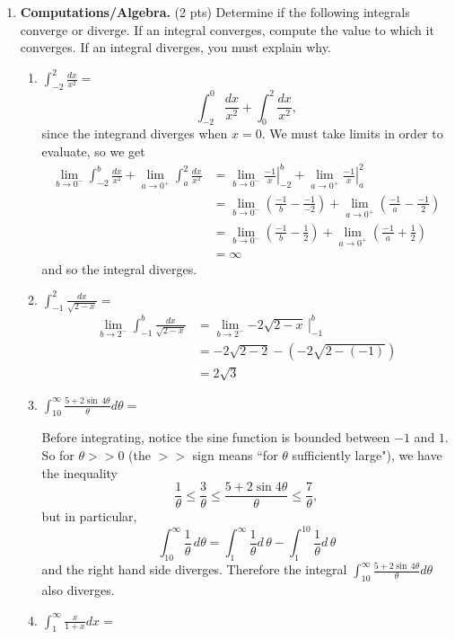\documentclass[11pt,letterpaper]{article}
\begin{document}
\begin{enumerate}
\begin{enumerate}
{\it -see the solution posted on the course website -}
\vspace{10pc}
\item (3 pts) Find $a$ and $b$.

{\it -see the solution posted on the course website -}
\vspace{9pc}
\end{enumerate}

\vspace{1pc}

\item \textbf{Computations/Algebra.} (2 pts)  Determine if the following integrals converge or diverge.  If an integral converges, compute the value to which it converges.  If an integral diverges, you must explain why.  \begin{enumerate}
\item $\int_{-2}^2\frac{dx}{x^2}=$
\[\int_{-2}^0\frac{dx}{x^2}+\int_0^2\frac{dx}{x^2},\]
since the integrand diverges when $x=0$.  We must take limits in order to evaluate, so we get
\begin{align*}
\lim_{b\to 0^-}\int_{-2}^b\frac{dx}{x^2}+\lim_{a\to 0^+}\int_a^2\frac{dx}{x^2} &= \lim_{b\to 0^-}\left.\frac{-1}{x}\right|_{-2}^b+\lim_{a\to 0^+}\left.\frac{-1}{x}\right|_a^2 \\
&= \lim_{b\to 0^-}\left(\frac{-1}{b}-\frac{-1}{-2}\right)+\lim_{a\to 0^+}\left(\frac{-1}{a}-\frac{-1}{2}\right) \\
&= \lim_{b\to 0^-}\left(\frac{-1}{b}-\frac{1}{2}\right)+\lim_{a\to 0^+}\left(\frac{-1}{a}+\frac{1}{2}\right) \\
&= \infty
\end{align*}
and so the integral diverges.
\vspace{0.5pc}
\item $\int_{-1}^2\frac{dx}{\sqrt{2-x}}=$
\begin{align*}
\lim_{b\to 2^-}\int_{-1}^b\frac{dx}{\sqrt{2-x}} &=\lim_{b\to 2^-}\left.-2\sqrt{2-x}\,\right|_{-1}^b \\
&= -2\sqrt{2-2}-\left(-2\sqrt{2-(-1)}\right) \\
&= 2\sqrt{3}
\end{align*}
\item $\int_{10}^{\infty}\frac{5+2\sin\,4\theta}{\theta}d\theta=$

Before integrating, notice the sine function is bounded between $-1$ and $1$.  So for $\theta>>0$ (the $>>$ sign means ``for $\theta$ sufficiently large"), we have the inequality
\[\frac{1}{\theta}\leq\frac{3}{\theta}\leq\frac{5+2\sin{4\theta}}{\theta}\leq\frac{7}{\theta},\]
but in particular, 
\[\int_{10}^{\infty}\frac{1}{\theta}\,d\theta=\int_1^{\infty}\frac{1}{\theta}d\,\theta-\int_1^{10}\frac{1}{\theta}d\,\theta\]
and the right hand side diverges.  Therefore the integral $\int_{10}^{\infty}\frac{5+2\sin\,4\theta}{\theta}d\theta$ also diverges.
\vspace{0.5pc}
\item $\int_1^{\infty}\frac{x}{1+x}dx=$


\end{enumerate}
\end{enumerate}
\end{document}
